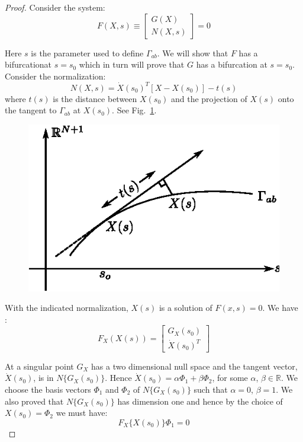 \begin{proof}
Consider the system:
\begin{equation*}
F(X,s) \equiv
\begin{bmatrix}
G(X)\\
N(X,s)
\end{bmatrix}
=0
\end{equation*}

Here $s$ is the parameter used to define $\Gamma_{ab}$. We will show
that $F$ has a bifurcation\pageoriginale at $s=s_0$ which in turn will
prove that 
$G$ has a bifurcation at $s=s_0$. Consider the normalization: 
$$
N(X,s) =\dot{X}(s_0)^T [X-X(s_0)]-t(s) 
$$
where $t(s)$ is the distance between $X(s_0)$ and the projection of
$X(s)$ onto the tangent to $\Gamma_{ab}$ at $X(s_0)$. See
Fig.~\ref{chap5-fig5.1}.  

\begin{figure}[H]
\centering
\includegraphics{vol79-fig/fig79-25.eps}
\smallskip
\caption{}
\label{chap5-fig5.1}
\end{figure}

With the indicated normalization, $X(s)$ is a solution of $F(x,s)=0$.
We have :
\begin{equation*}
F_X(X(s))=
\begin{bmatrix}
G_X(s_0)\\
\dot{X}(s_0)^T
\end{bmatrix}
\end{equation*}

At a singular point $G_X$ has a two dimensional null space and the
tangent vector, $\dot{X}(s_0)$, is in $N\{G_X(s_0)\}$. Hence
$\dot{X}(s_0)= \alpha \Phi_1 + \beta \Phi_2$, for some $\alpha$, $\beta
\in \mathbb{R}$. We choose the basis vectors $\Phi_1$ and
$\Phi_2$ of $N\{G_X(s_0)\}$ such that\pageoriginale 
$\alpha = 0$, $\beta=1$. We also
proved that $N\{G_X(s_0)\}$ has dimension one and hence by the choice
of $X(s_0)= \Phi_2$ we must have: 
$$
F_X\{X(s_0)\} \Phi_1=0
$$


\end{proof}
